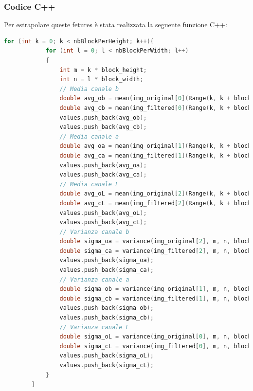 \documentclass[a4paper,11pt]{article}
\begin{document}
    \subsubsection{Codice C++}
    Per estrapolare queste fetures è stata realizzata la seguente funzione C++:
    \begin{lstlisting}[language=C++]
        for (int k = 0; k < nbBlockPerHeight; k++){
            for (int l = 0; l < nbBlockPerWidth; l++)
            {
                int m = k * block_height;
                int n = l * block_width;
                // Media canale b
                double avg_ob = mean(img_original[0](Range(k, k + block_height), Range(l, l + block_width)))[0];
                double avg_cb = mean(img_filtered[0](Range(k, k + block_height), Range(l, l + block_width)))[0];
                values.push_back(avg_ob);
                values.push_back(avg_cb);
                // Media canale a
                double avg_oa = mean(img_original[1](Range(k, k + block_height), Range(l, l + block_width)))[0];
                double avg_ca = mean(img_filtered[1](Range(k, k + block_height), Range(l, l + block_width)))[0];
                values.push_back(avg_oa);
                values.push_back(avg_ca);
                // Media canale L
                double avg_oL = mean(img_original[2](Range(k, k + block_height), Range(l, l + block_width)))[0];
                double avg_cL = mean(img_filtered[2](Range(k, k + block_height), Range(l, l + block_width)))[0];
                values.push_back(avg_oL);
                values.push_back(avg_cL);
                // Varianza canale b
                double sigma_oa = variance(img_original[2], m, n, block_height, block_width);
                double sigma_ca = variance(img_filtered[2], m, n, block_height, block_width);
                values.push_back(sigma_oa);
                values.push_back(sigma_ca);
                // Varianza canale a
                double sigma_ob = variance(img_original[1], m, n, block_height, block_width);
                double sigma_cb = variance(img_filtered[1], m, n, block_height, block_width);
                values.push_back(sigma_ob);
                values.push_back(sigma_cb);
                // Varianza canale L
                double sigma_oL = variance(img_original[0], m, n, block_height, block_width);
                double sigma_cL = variance(img_filtered[0], m, n, block_height, block_width);
                values.push_back(sigma_oL);
                values.push_back(sigma_cL);
            }
        }
    \end{lstlisting}   
\end{document}
